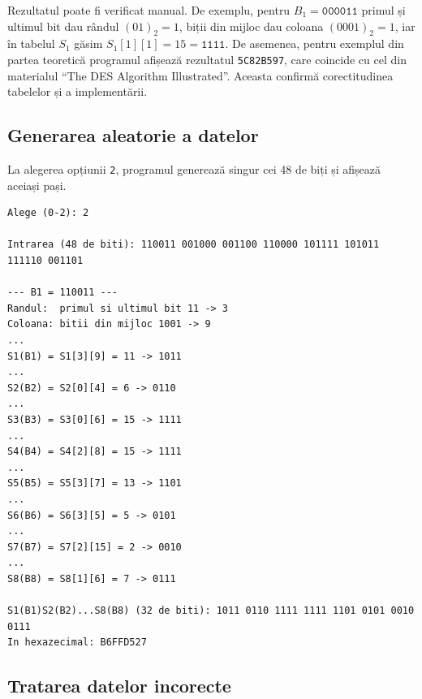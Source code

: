\documentclass[12pt,a4paper]{article}
\begin{document}
Rezultatul poate fi verificat manual. De exemplu, pentru $B_1 = \texttt{000011}$
primul și ultimul bit dau rândul $(01)_2 = 1$, biții din mijloc dau coloana
$(0001)_2 = 1$, iar în tabelul $S_1$ găsim $S_1[1][1] = 15 = \texttt{1111}$.
De asemenea, pentru exemplul din partea teoretică programul afișează rezultatul
\texttt{5C82B597}, care coincide cu cel din materialul
\enquote{The DES Algorithm Illustrated}. Aceasta confirmă corectitudinea tabelelor
și a implementării.


\subsection{Generarea aleatorie a datelor}

La alegerea opțiunii \texttt{2}, programul generează singur cei 48 de biți și
afișează aceiași pași.

\begin{lstlisting}[style=terminal, caption={Aplicarea cutiilor S pentru date generate aleatoriu}]
Alege (0-2): 2

Intrarea (48 de biti): 110011 001000 001100 110000 101111 101011 111110 001101

--- B1 = 110011 ---
Randul:  primul si ultimul bit 11 -> 3
Coloana: bitii din mijloc 1001 -> 9
...
S1(B1) = S1[3][9] = 11 -> 1011
...
S2(B2) = S2[0][4] = 6 -> 0110
...
S3(B3) = S3[0][6] = 15 -> 1111
...
S4(B4) = S4[2][8] = 15 -> 1111
...
S5(B5) = S5[3][7] = 13 -> 1101
...
S6(B6) = S6[3][5] = 5 -> 0101
...
S7(B7) = S7[2][15] = 2 -> 0010
...
S8(B8) = S8[1][6] = 7 -> 0111

S1(B1)S2(B2)...S8(B8) (32 de biti): 1011 0110 1111 1111 1101 0101 0010 0111
In hexazecimal: B6FFD527
\end{lstlisting}


\subsection{Tratarea datelor incorecte}
\end{document}
